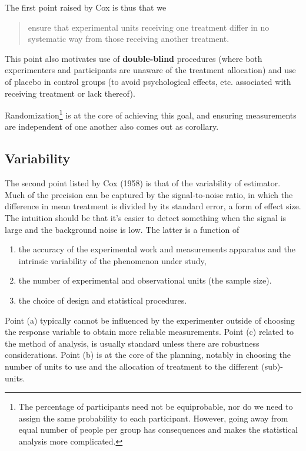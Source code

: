 \documentclass[
  11pt,
  letterpaper,
]{scrbook}
\providecommand{\tightlist}{%
  \setlength{\itemsep}{0pt}\setlength{\parskip}{0pt}}\usepackage{longtable,booktabs,array}
\theoremstyle{definition}
\theoremstyle{remark}
\begin{document}
The first point raised by Cox is thus that we

\begin{quote}
ensure that experimental units receiving one treatment differ in no
systematic way from those receiving another treatment.
\end{quote}

This point also motivates use of \textbf{double-blind} procedures (where
both experimenters and participants are unaware of the treatment
allocation) and use of placebo in control groups (to avoid psychological
effects, etc. associated with receiving treatment or lack thereof).

Randomization\footnote{The percentage of participants need not be
  equiprobable, nor do we need to assign the same probability to each
  participant. However, going away from equal number of people per group
  has consequences and makes the statistical analysis more complicated.}
is at the core of achieving this goal, and ensuring measurements are
independent of one another also comes out as corollary.

\hypertarget{variability}{%
\subsection{Variability}\label{variability}}

The second point listed by Cox (1958) is that of the variability of
estimator. Much of the precision can be captured by the signal-to-noise
ratio, in which the difference in mean treatment is divided by its
standard error, a form of effect size. The intuition should be that it's
easier to detect something when the signal is large and the background
noise is low. The latter is a function of

\begin{enumerate}
\def\labelenumi{(\alph{enumi})}
\tightlist
\item
  the accuracy of the experimental work and measurements apparatus and
  the intrinsic variability of the phenomenon under study,
\item
  the number of experimental and observational units (the sample size).
\item
  the choice of design and statistical procedures.
\end{enumerate}

Point (a) typically cannot be influenced by the experimenter outside of
choosing the response variable to obtain more reliable measurements.
Point (c) related to the method of analysis, is usually standard unless
there are robustness considerations. Point (b) is at the core of the
planning, notably in choosing the number of units to use and the
allocation of treatment to the different (sub)-units.
\end{document}
